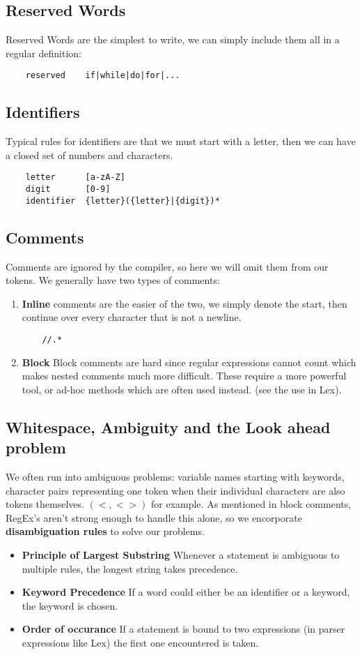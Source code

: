 \documentclass{report}
\theoremstyle{definition}
\begin{document}
		\subsection{Reserved Words}
			Reserved Words are the simplest to write, we can simply include them all in a regular definition:
\begin{lstlisting}
	reserved	if|while|do|for|...
\end{lstlisting}
		\subsection{Identifiers}
			Typical rules for identifiers are that we must start with a letter, then we can have a closed set of numbers
			and characters.
\begin{lstlisting}
	letter		[a-zA-Z]
	digit		[0-9]
	identifier	{letter}({letter}|{digit})*
\end{lstlisting}
		\subsection{Comments}
			Comments are ignored by the compiler, so here we will omit them from our tokens. We generally have two
			types of comments:
			\begin{enumerate}
				\item \textbf{Inline} comments are the easier of the two, we simply denote the start, then continue over
					every character that is not a newline.
\begin{lstlisting}
	//.*
\end{lstlisting}
				\item \textbf{Block} Block comments are hard since regular expressions cannot count which makes
					nested comments much more difficult. These require a more powerful tool, or ad-hoc methods 
					which are often used instead. (see the use in Lex).
			\end{enumerate}
		\subsection{Whitespace, Ambiguity and the Look ahead problem}
			We often run into ambiguous problems: variable names starting with keywords, character pairs representing one token
			when their individual characters are also tokens themselves. $(<, <>)$ for example. As mentioned in block
			comments, RegEx's aren't strong enough to handle this alone, so we encorporate \textbf{disambiguation rules}
			to solve our problems.
			\begin{itemize}
				\item \textbf{Principle of Largest Substring}
					Whenever a statement is ambiguous to multiple rules, the longest string takes precedence.
				\item \textbf{Keyword Precedence}
					If a word could either be an identifier or a keyword, the keyword is chosen.
				\item \textbf{Order of occurance}
					If a statement is bound to two expressions (in parser expressions like Lex) the first one encountered
					is taken.
			\end{itemize}
			
\end{document}
